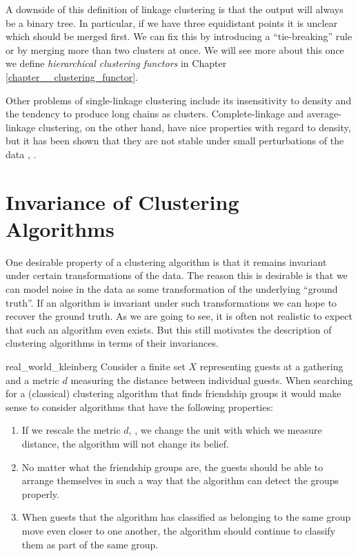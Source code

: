 A downside of this definition of linkage clustering is that the output will always be a binary tree. In particular, if we have three equidistant points it is unclear which should be merged first. We can fix this by introducing a ``tie-breaking'' rule or by merging more than two clusters at once. We will see more about this once we define \emph{hierarchical clustering functors} in Chapter \ref{chapter__clustering_functor}.

Other problems of single-linkage clustering include its insensitivity to density and the tendency to produce long chains as clusters.
Complete-linkage and average-linkage clustering, on the other hand, have nice properties with regard to density, but it has been shown that they are not stable under small perturbations of the data \cite[Sec.~3.6]{JMLR:v11:carlsson10a}, \cite{Lance1967-ci}.

\section{Invariance of Clustering Algorithms}
\label{seciton__preserving_structure}

One desirable property of a clustering algorithm is that it remains invariant under certain transformations of the data.
The reason this is desirable is that we can model noise in the data as some transformation of the underlying ``ground truth''.
If an algorithm is invariant under such transformations we can hope to recover the ground truth. As we are going to see, it is often not realistic to expect that such an algorithm even exists. But this still motivates the description of clustering algorithms in terms of their invariances.

\begin{example}{}{real_world_kleinberg}
Consider a finite set $X$ representing guests at a gathering and a metric $d$ measuring the distance between individual guests.
When searching for a (classical) clustering algorithm that finds friendship groups it would make sense to consider algorithms that have the following properties:

\begin{enumerate}
    \item If we rescale the metric $d$, \ie, we change the unit with which we measure distance, the algorithm will not change its belief.
    \item No matter what the friendship groups are, the guests should be able to arrange themselves in such a way that the algorithm can detect the groups properly.
    \item When guests that the algorithm has classified as belonging to the same group move even closer to one another, the algorithm should continue to classify them as part of the same group.
\end{enumerate}
\end{example}

